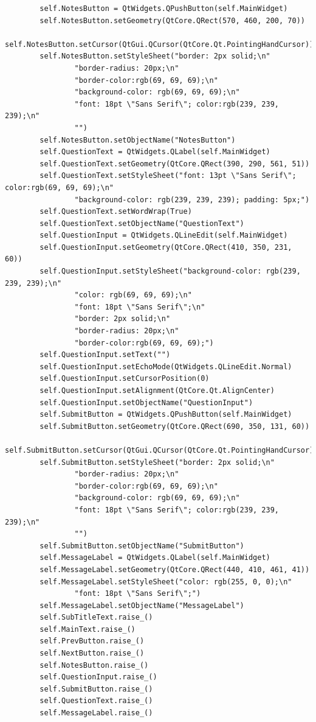 \documentclass{article}
\begin{document}
\begin{lstlisting}
        self.NotesButton = QtWidgets.QPushButton(self.MainWidget)
        self.NotesButton.setGeometry(QtCore.QRect(570, 460, 200, 70))
        self.NotesButton.setCursor(QtGui.QCursor(QtCore.Qt.PointingHandCursor))
        self.NotesButton.setStyleSheet("border: 2px solid;\n"
                "border-radius: 20px;\n"
                "border-color:rgb(69, 69, 69);\n"
                "background-color: rgb(69, 69, 69);\n"
                "font: 18pt \"Sans Serif\"; color:rgb(239, 239, 239);\n"
                "")
        self.NotesButton.setObjectName("NotesButton")
        self.QuestionText = QtWidgets.QLabel(self.MainWidget)
        self.QuestionText.setGeometry(QtCore.QRect(390, 290, 561, 51))
        self.QuestionText.setStyleSheet("font: 13pt \"Sans Serif\"; color:rgb(69, 69, 69);\n"
                "background-color: rgb(239, 239, 239); padding: 5px;")
        self.QuestionText.setWordWrap(True)
        self.QuestionText.setObjectName("QuestionText")
        self.QuestionInput = QtWidgets.QLineEdit(self.MainWidget)
        self.QuestionInput.setGeometry(QtCore.QRect(410, 350, 231, 60))
        self.QuestionInput.setStyleSheet("background-color: rgb(239, 239, 239);\n"
                "color: rgb(69, 69, 69);\n"
                "font: 18pt \"Sans Serif\";\n"
                "border: 2px solid;\n"
                "border-radius: 20px;\n"
                "border-color:rgb(69, 69, 69);")
        self.QuestionInput.setText("")
        self.QuestionInput.setEchoMode(QtWidgets.QLineEdit.Normal)
        self.QuestionInput.setCursorPosition(0)
        self.QuestionInput.setAlignment(QtCore.Qt.AlignCenter)
        self.QuestionInput.setObjectName("QuestionInput")
        self.SubmitButton = QtWidgets.QPushButton(self.MainWidget)
        self.SubmitButton.setGeometry(QtCore.QRect(690, 350, 131, 60))
        self.SubmitButton.setCursor(QtGui.QCursor(QtCore.Qt.PointingHandCursor))
        self.SubmitButton.setStyleSheet("border: 2px solid;\n"
                "border-radius: 20px;\n"
                "border-color:rgb(69, 69, 69);\n"
                "background-color: rgb(69, 69, 69);\n"
                "font: 18pt \"Sans Serif\"; color:rgb(239, 239, 239);\n"
                "")
        self.SubmitButton.setObjectName("SubmitButton")
        self.MessageLabel = QtWidgets.QLabel(self.MainWidget)
        self.MessageLabel.setGeometry(QtCore.QRect(440, 410, 461, 41))
        self.MessageLabel.setStyleSheet("color: rgb(255, 0, 0);\n"
                "font: 18pt \"Sans Serif\";")
        self.MessageLabel.setObjectName("MessageLabel")
        self.SubTitleText.raise_()
        self.MainText.raise_()
        self.PrevButton.raise_()
        self.NextButton.raise_()
        self.NotesButton.raise_()
        self.QuestionInput.raise_()
        self.SubmitButton.raise_()
        self.QuestionText.raise_()
        self.MessageLabel.raise_()


\end{lstlisting}
\end{document}
